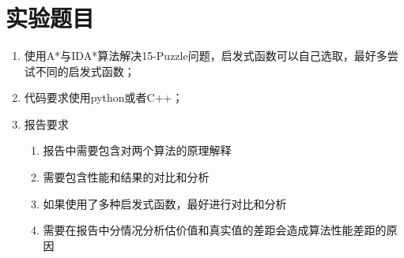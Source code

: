 \documentclass[10pt,letterpaper]{ctexart}
\begin{document}
\pagestyle{plain}
\title{
    \begin{center}
        \phantom{Start!}
    	  \vspace{2cm}
    \end{center}
}
\maketitle

\begin{center}
    \setlength{\baselineskip}{40pt}
    \vspace{1cm}
\end{center}
\pagebreak

\section{实验题目}
\begin{enumerate}[itemindent=1.5em,label=\arabic*、]
  \item 使用A*与IDA*算法解决15-Puzzle问题，启发式函数可以自己选取，最好多尝试不同的启发式函数；
  \item 代码要求使用python或者C++；
  \item 报告要求
  \begin{enumerate}
    \item 报告中需要包含对两个算法的原理解释
    \item 需要包含性能和结果的对比和分析
    \item 如果使用了多种启发式函数，最好进行对比和分析
    \item 需要在报告中分情况分析估价值和真实值的差距会造成算法性能差距的原因
  \end{enumerate}
\end{enumerate}
\end{document}
